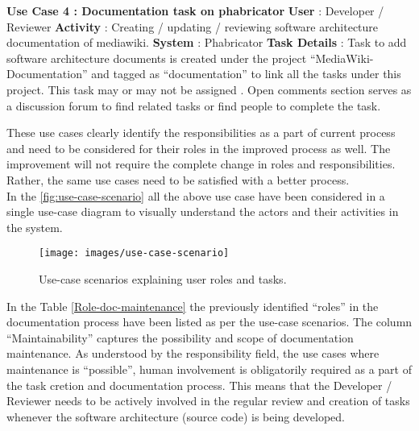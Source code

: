 \begin{mdframed}[leftmargin=10pt,rightmargin=10pt]
\textbf{Use Case 4 : Documentation task on phabricator}
\newline \newline \indent \textbf{User} : Developer / Reviewer
\newline \newline \indent \textbf{Activity} : Creating / updating / reviewing software architecture documentation of mediawiki.
\newline \newline \indent \textbf{System} : Phabricator
\newline \newline \indent \textbf{Task Details} : Task to add software architecture documents is created under the project \enquote{MediaWiki-Documentation} \cite{MW_doc_phab} and tagged as \enquote{documentation} to link all the tasks under this project. This task may or may not be assigned . Open comments section serves as a discussion forum to find related tasks or find people to complete the task.
\end{mdframed}
These use cases clearly identify the responsibilities as a part of current process and need to be considered for their roles in the improved process as well. The improvement will not require the complete change in roles and responsibilities. Rather, the same use cases need to be satisfied with a better process.
\newline
\\\indent In the \autoref{fig:use-case-scenario} all the above use case have been considered in a single use-case diagram to visually understand the actors and their activities in the system.

\begin{figure}[H]
  \centering
  \texttt{[image: images/use-case-scenario]}
  \caption[Use-case scenarios explaining user roles and tasks]{Use-case scenarios explaining user roles and tasks.}\label{fig:use-case-scenario}
\end{figure}

In the Table \autoref{Role-doc-maintenance} the previously identified \enquote{roles} in the documentation process have been listed as per the use-case scenarios. The column \enquote{Maintainability} captures the possibility and scope of documentation maintenance. As understood by the responsibility field, the use cases where maintenance is \enquote{possible}, human involvement is obligatorily required as a part of the task cretion and documentation process. This means that the Developer / Reviewer needs to be actively involved in the regular review and creation of tasks whenever the software architecture (source code) is being developed.

